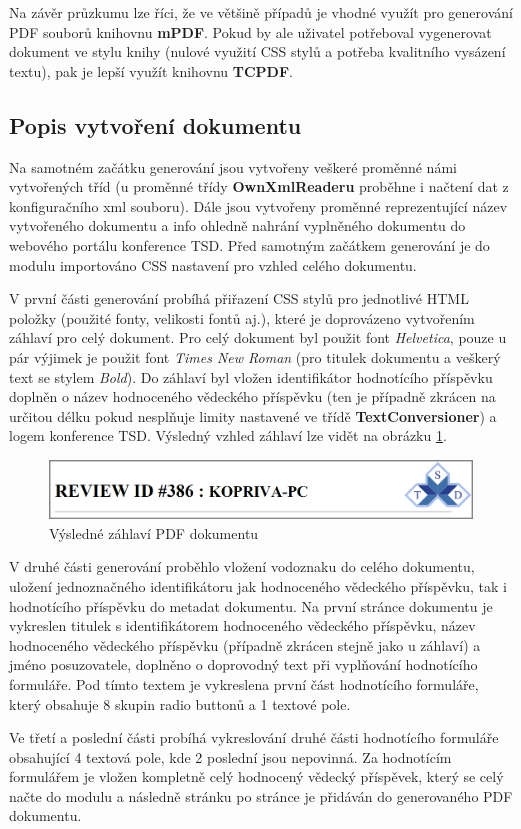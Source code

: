 \par
Na závěr průzkumu lze říci, že ve většině případů je vhodné využít pro generování PDF souborů knihovnu \textbf{mPDF}. Pokud by ale uživatel potřeboval vygenerovat dokument ve stylu knihy (nulové využití CSS stylů a potřeba kvalitního vysázení textu), pak je lepší využít knihovnu \textbf{TCPDF}. 

\subsection{Popis vytvoření dokumentu}
Na samotném začátku generování jsou vytvořeny veškeré proměnné námi vytvořených tříd (u proměnné třídy \textbf{OwnXmlReaderu} proběhne i načtení dat z konfiguračního xml souboru). Dále jsou vytvořeny proměnné reprezentující název vytvořeného dokumentu a info ohledně nahrání vyplněného dokumentu do webového portálu konference TSD. Před samotným začátkem generování je do modulu importováno CSS nastavení pro vzhled celého dokumentu.
\par
V první části generování probíhá přiřazení CSS stylů pro jednotlivé HTML položky (použité fonty, velikosti fontů aj.), které je doprovázeno vytvořením záhlaví pro celý dokument. Pro celý dokument byl použit font \textit{Helvetica}, pouze u pár výjimek je použit font \textit{Times New Roman} (pro titulek dokumentu a veškerý text se stylem \textit{Bold}).  Do záhlaví byl vložen identifikátor hodnotícího příspěvku doplněn o název hodnoceného vědeckého příspěvku (ten je případně zkrácen na určitou délku pokud nesplňuje limity nastavené ve třídě \textbf{TextConversioner}) a logem konference TSD. Výsledný vzhled záhlaví lze vidět na obrázku \ref{fig:implement_zahlavi}.
	\begin{figure}[h!]
	\centering
	\includegraphics[width=14cm]{img/implement_zahlavi}
	\caption{Výsledné záhlaví PDF dokumentu}
	\label{fig:implement_zahlavi}
	\end{figure}
\newpage
\par
V druhé části generování proběhlo vložení vodoznaku do celého dokumentu, uložení jednoznačného identifikátoru jak hodnoceného vědeckého příspěvku, tak i hodnotícího příspěvku do metadat dokumentu. Na první stránce dokumentu je vykreslen titulek s identifikátorem hodnoceného vědeckého příspěvku, název hodnoceného vědeckého příspěvku (případně zkrácen stejně jako u záhlaví) a jméno posuzovatele, doplněno o doprovodný text při vyplňování hodnotícího formuláře. Pod tímto textem je vykreslena první část hodnotícího formuláře, který obsahuje 8 skupin radio buttonů a 1 textové pole.
\par
Ve třetí a poslední části probíhá vykreslování druhé části hodnotícího formuláře obsahující 4 textová pole, kde 2 poslední jsou nepovinná. Za hodnotícím formulářem je vložen kompletně celý hodnocený vědecký příspěvek, který se celý načte do modulu a následně stránku po stránce je přidáván do generovaného PDF dokumentu.

